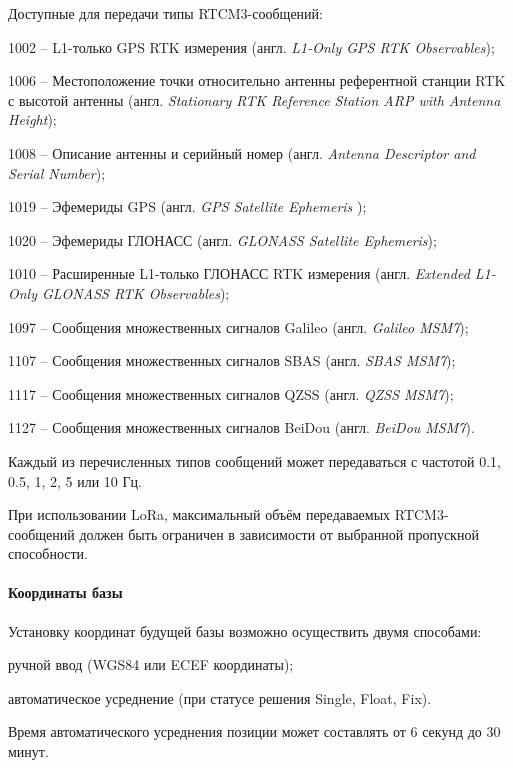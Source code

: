 Доступные для передачи типы RTCM3-сообщений:
\begin{dashitemize}
  \item 1002 -- L1-только GPS RTK измерения (англ. \emph{L1-Only GPS RTK Observables});
  \item 1006 -- Местоположение точки относительно антенны референтной станции RTK с высотой антенны (англ. \emph{Stationary RTK Reference Station ARP with Antenna Height});
  \item 1008 -- Описание антенны и серийный номер (англ. \emph{Antenna Descriptor and Serial Number});
  \item 1019 -- Эфемериды GPS (англ. \emph{GPS Satellite Ephemeris });
  \item 1020 -- Эфемериды ГЛОНАСС (англ. \emph{GLONASS Satellite Ephemeris});
  \item 1010 -- Расширенные L1-только ГЛОНАСС RTK измерения (англ. \emph{Extended L1-Only GLONASS RTK Observables});
  \item 1097 -- Сообщения множественных сигналов Galileo (англ. \emph{Galileo MSM7});
  \item 1107 -- Сообщения множественных сигналов SBAS (англ. \emph{SBAS MSM7});
  \item 1117 -- Сообщения множественных сигналов QZSS (англ. \emph{QZSS MSM7});
  \item 1127 -- Сообщения множественных сигналов BeiDou (англ. \emph{BeiDou MSM7}).
\end{dashitemize}

Каждый из перечисленных типов сообщений может передаваться с частотой 0.1, 0.5, 1, 2, 5 или 10 Гц.

При использовании LoRa, максимальный объём передаваемых RTCM3-сообщений должен быть ограничен в зависимости от выбранной пропускной способности.

\paragraph{Координаты базы}

Установку координат будущей базы возможно осуществить двумя способами:
\begin{dashitemize}
  \item ручной ввод (WGS84 или ECEF координаты);
  \item автоматическое усреднение (при статусе решения Single, Float, Fix).
\end{dashitemize}

Время автоматического усреднения позиции может составлять от 6 секунд до 30 минут.



